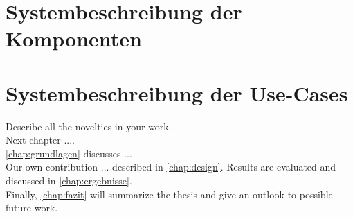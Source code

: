 \documentclass[thesis.tex]{subfiles}
\begin{document}
\section{Systembeschreibung der Komponenten} \label{bib:goals}



\section{Systembeschreibung der Use-Cases}
Describe all the novelties in your work.
\\
Next chapter ....
\\
\autoref{chap:grundlagen} discusses ...
\\
Our own contribution ... described in \autoref{chap:design}.
Results are evaluated and discussed in \autoref{chap:ergebnisse}.
\\
Finally, \autoref{chap:fazit} will summarize the thesis and give an outlook to possible future work.

\subfilebib %
\end{document}
